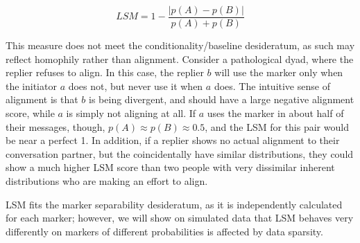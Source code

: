 \documentclass{acm_proc_article-sp}
\begin{document}
\begin{equation}
LSM = 1 - \frac{|p(A)-p(B)|}{p(A)+p(B)}
\end{equation}

This measure does not meet the conditionality/baseline desideratum, as such may reflect homophily rather than alignment.  Consider a pathological dyad, where the replier refuses to align.  In this case, the replier $b$ will use the marker only when the initiator $a$ does not, but never use it when $a$ does. The intuitive sense of alignment is that $b$ is being divergent, and should have a large negative alignment score, while $a$ is simply not aligning at all. If $a$ uses the marker in about half of their messages, though, $p(A) \approx p(B) \approx 0.5$, and the LSM for this pair would be near a perfect 1.  In addition, if a replier shows no actual alignment to their conversation partner, but the coincidentally have similar distributions, they could show a much higher LSM score than two people with very dissimilar inherent distributions who are making an effort to align. 

LSM fits the marker separability desideratum, as it is independently calculated for each marker; however, we will show on simulated data that LSM behaves very differently on markers of different probabilities is affected by data sparsity.





\end{document}
